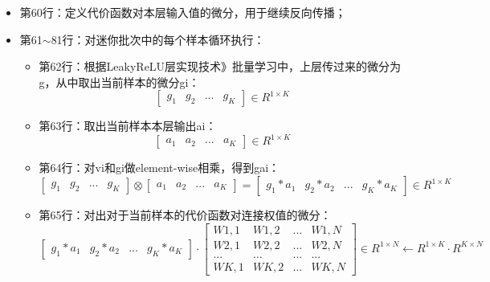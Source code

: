 \documentclass[UTF8]{article}
\begin{document}
\begin{itemize}
\item 第60行：定义代价函数对本层输入值的微分，用于继续反向传播；
\item 第61$\sim$81行：对迷你批次中的每个样本循环执行：
	\begin{itemize}
	\item 第62行：根据LeakyReLU层实现技术》批量学习中，上层传过来的微分为g，从中取出当前样本的微分gi：
	\begin{equation}
	\begin{bmatrix}
	g_{1} & g_{2} & ... & g_{K}
	\end{bmatrix} \in R^{1 \times K}
	\label{mlp-leaky-relu-backward-pass-unittest-gi}
	\end{equation}
	\item 第63行：取出当前样本本层输出ai：
	\begin{equation}
	\begin{bmatrix}
	a_{1} & a_{2} & ... & a_{K}
	\end{bmatrix} \in R^{1 \times K}
	\label{ml-leaky-relu-backward-pass-unittest-ai}
	\end{equation}
	\item 第64行：对vi和gi做element-wise相乘，得到gai：
	\begin{equation}
	\begin{bmatrix}
	g_{1} & g_{2} & ... & g_{K}
	\end{bmatrix} \otimes
	 \begin{bmatrix}
	a_{1} & a_{2} & ... & a_{K}
	\end{bmatrix}
	=\begin{bmatrix}
	g_{1}*a_{1} & g_{2}*a_{2} & ... & g_{K}*a_{K}
	\end{bmatrix}
	\label{mlp-leaky-relu-backward-pass-gai} \in R^{1 \times K}
	\end{equation}
	\item 第65行：对出对于当前样本的代价函数对连接权值的微分：
	\begin{equation}
	\begin{bmatrix}
	g_{1}*a_{1} & g_{2}*a_{2} & ... & g_{K}*a_{K}
	\end{bmatrix} \cdot
	 \begin{bmatrix}
	W{1,1} & W{1,2} & ... & W{1,N} \\
	W{2,1} & W{2,2} & ... & W{2,N} \\
	... & ... & ... & ... \\
	W{K,1} & W{K,2} & ... & W{K,N}
	 \end{bmatrix} \in R^{1 \times N} \leftarrow R^{1 \times K} \cdot R^{K \times N}
	\label{mlp-leaky-relu-backward-pass-gvw}

\end{equation}
\end{itemize}
\end{itemize}
\end{document}
